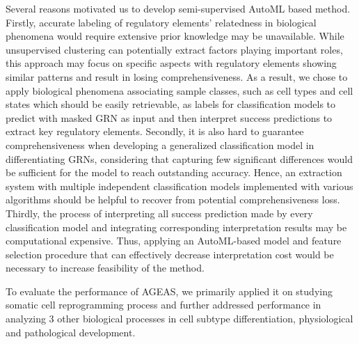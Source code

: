 \documentclass[fleqn,10pt]{wlscirep}
\begin{document}
  Several reasons motivated us to develop semi-supervised AutoML based method.
  Firstly, accurate labeling of regulatory elements' relatedness in biological phenomena would require extensive prior knowledge may be unavailable.
  While unsupervised clustering can potentially extract factors playing important roles, this approach may focus on specific aspects with regulatory elements showing similar patterns and result in losing comprehensiveness.
  As a result, we chose to apply biological phenomena associating sample classes, such as cell types and cell states which should be easily retrievable, as labels for classification models to predict with masked GRN as input and then interpret success predictions to extract key regulatory elements.
  Secondly, it is also hard to guarantee comprehensiveness when developing a generalized classification model in differentiating GRNs, considering that capturing few significant differences would be sufficient for the model to reach outstanding accuracy.
  Hence, an extraction system with multiple independent classification models implemented with various algorithms should be helpful to recover from potential comprehensiveness loss.
  Thirdly, the process of interpreting all success prediction made by every classification model and integrating corresponding interpretation results may be computational expensive.
  Thus, applying an AutoML-based model and feature selection procedure that can effectively decrease interpretation cost would be necessary to increase feasibility of the method.

  To evaluate the performance of AGEAS, we primarily applied it on studying somatic cell reprogramming process and further addressed performance in analyzing 3 other biological processes in cell subtype differentiation, physiological and pathological development.
\end{document}
